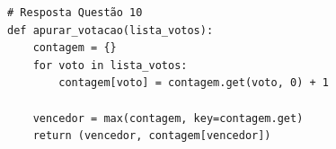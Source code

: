 \ifmostrarGabarito
\begin{verbatim}
# Resposta Questão 10
def apurar_votacao(lista_votos):
    contagem = {}
    for voto in lista_votos:
        contagem[voto] = contagem.get(voto, 0) + 1
        
    vencedor = max(contagem, key=contagem.get)
    return (vencedor, contagem[vencedor])
\end{verbatim}
\fi
